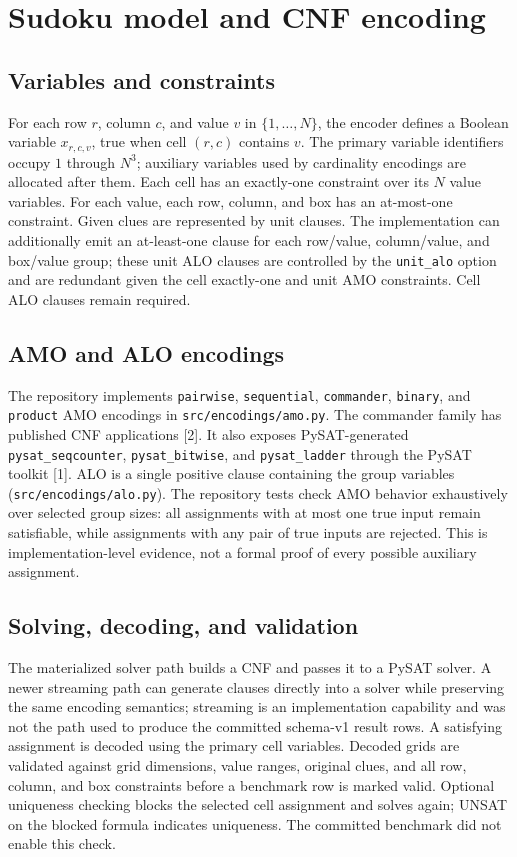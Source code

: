 \IfFileExists{cas-sc.cls}{\documentclass[a4paper,fleqn]{cas-sc}}{\documentclass[a4paper,11pt]{article}}
\begin{document}
\section{Sudoku model and CNF encoding}
\subsection{Variables and constraints}
For each row $r$, column $c$, and value $v$ in $\{1,\ldots,N\}$, the encoder defines a Boolean variable $x_{r,c,v}$, true when cell $(r,c)$ contains $v$. The primary variable identifiers occupy $1$ through $N^3$; auxiliary variables used by cardinality encodings are allocated after them. Each cell has an exactly-one constraint over its $N$ value variables. For each value, each row, column, and box has an at-most-one constraint. Given clues are represented by unit clauses. The implementation can additionally emit an at-least-one clause for each row/value, column/value, and box/value group; these unit ALO clauses are controlled by the \texttt{unit\_alo} option and are redundant given the cell exactly-one and unit AMO constraints. Cell ALO clauses remain required.

\subsection{AMO and ALO encodings}
The repository implements \texttt{pairwise}, \texttt{sequential}, \texttt{commander}, \texttt{binary}, and \texttt{product} AMO encodings in \texttt{src/encodings/amo.py}. The commander family has published CNF applications [2]. It also exposes PySAT-generated \texttt{pysat\_seqcounter}, \texttt{pysat\_bitwise}, and \texttt{pysat\_ladder} through the PySAT toolkit [1]. ALO is a single positive clause containing the group variables (\texttt{src/encodings/alo.py}). The repository tests check AMO behavior exhaustively over selected group sizes: all assignments with at most one true input remain satisfiable, while assignments with any pair of true inputs are rejected. This is implementation-level evidence, not a formal proof of every possible auxiliary assignment.

\subsection{Solving, decoding, and validation}
The materialized solver path builds a CNF and passes it to a PySAT solver. A newer streaming path can generate clauses directly into a solver while preserving the same encoding semantics; streaming is an implementation capability and was not the path used to produce the committed schema-v1 result rows. A satisfying assignment is decoded using the primary cell variables. Decoded grids are validated against grid dimensions, value ranges, original clues, and all row, column, and box constraints before a benchmark row is marked valid. Optional uniqueness checking blocks the selected cell assignment and solves again; UNSAT on the blocked formula indicates uniqueness. The committed benchmark did not enable this check.
\end{document}
